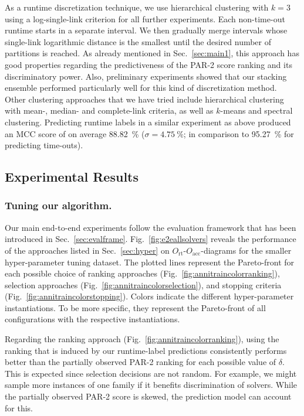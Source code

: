 \documentclass[runningheads]{llncs}
\begin{document}
As a runtime discretization technique, we use hierarchical clustering with $k = 3$ using a log-single-link criterion for all further experiments.
Each non-time-out runtime starts in a separate interval.
We then gradually merge intervals whose single-link logarithmic distance is the smallest until the desired number of partitions is reached.
As already mentioned in Sec.~\ref{sec:main1}, this approach has good properties regarding the predictiveness of the PAR-2 score ranking and its discriminatory power.
Also, preliminary experiments showed that our stacking ensemble performed particularly well for this kind of discretization method.
Other clustering approaches that we have tried include hierarchical clustering with mean-, median- and complete-link criteria, as well as $k$-means and spectral clustering.
Predicting runtime labels in a similar experiment as above produced an MCC score of on average \SI{88.82}{\%} ($\sigma = \SI{4.75}{\%}$; in comparison to \SI{95.27}{\%} for predicting time-outs).

\subsection{Experimental Results}
\subsubsection{Tuning our algorithm.}
Our main end-to-end experiments follow the evaluation framework that has been introduced in Sec.~\ref{sec:evalframe}.
Fig.~\ref{fig:e2eallsolvers} reveals the performance of the approaches listed in Sec.~\ref{sec:hyper} on $O_{\operatorname{rt}}$-$O_{\operatorname{acc}}$-diagrams for the smaller hyper-parameter tuning dataset.
The plotted lines represent the Pareto-front for each possible choice of ranking approaches (Fig.~\ref{fig:annitraincolorranking}), selection approaches (Fig.~\ref{fig:annitraincolorselection}), and stopping criteria (Fig.~\ref{fig:annitraincolorstopping}).
Colors indicate the different hyper-parameter instantiations.
To be more specific, they represent the Pareto-front of all configurations with the respective instantiations.

Regarding the ranking approach (Fig.~\ref{fig:annitraincolorranking}), using the ranking that is induced by our runtime-label predictions consistently performs better than the partially observed PAR-2 ranking for each possible value of $\delta$.
This is expected since selection decisions are not random.
For example, we might sample more instances of one family if it benefits discrimination of solvers.
While the partially observed PAR-2 score is skewed, the prediction model can account for this.
\end{document}
